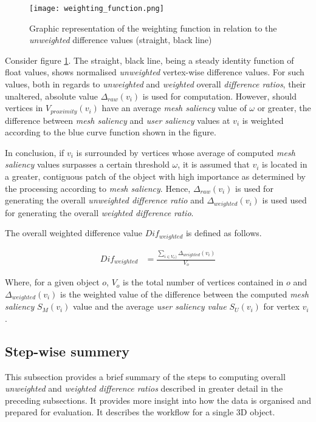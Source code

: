 \begin{figure}[htb]
  \centering
  \texttt{[image: weighting\_function.png]}\\ %
  \caption{Graphic representation of the weighting function in relation to the \textit{unweighted} difference values (straight, black line)}\label{fig:weighting_function}
\end{figure}

Consider figure \ref{fig:weighting_function}. The straight, black line, being a steady identity function of float values, shows normalised \textit{unweighted} vertex-wise difference values. For such values, both in regards to \textit{unweighted} and \textit{weighted} overall \textit{difference ratios}, their unaltered, absolute value $\Delta_{raw}(v_i)$ is used for computation. However, should vertices in $V_{proximity}(v_i)$ have an average \textit{mesh saliency} value of $\omega$ or greater, the difference between \textit{mesh saliency} and \textit{user saliency} values at $v_i$ is weighted according to the blue curve function shown in the figure.

In conclusion, if $v_i$ is surrounded by vertices whose average of computed \textit{mesh saliency} values surpasses a certain threshold $\omega$, it is assumed that $v_i$ is located in a greater, contiguous patch of the object with high importance as determined by the processing according to \textit{mesh saliency}. Hence, $\Delta_{raw}(v_i)$ is used for generating the overall \textit{unweighted difference ratio} and $\Delta_{weighted}(v_i)$ is used used for generating the overall \textit{weighted difference ratio}.

The overall weighted difference value $Dif_{weighted}$ is defined as follows.

\begin{align*}
Dif_{weighted} &= \frac
	{
		\sum_{i \in V_{o})}
			\Delta_{weighted}(v_i)
	}{
		V_{o}
	}
\end{align*}

Where, for a given object $o$, $V_{o}$ is the total number of vertices contained in $o$ and $\Delta_{weighted}(v_i)$ is the weighted value of the difference between the computed \textit{mesh saliency} $S_{M}(v_i)$ value and the average \textit{user saliency value} $S_{U}(v_i)$ for vertex $v_i$.


		\subsection{Step-wise summery}
		\label{sec:ste_wise_summery}
This subsection provides a brief summary of the steps to computing overall \textit{unweighted} and \textit{weighted difference ratios} described in greater detail in the preceding subsections. It provides more insight into how the data is organised and prepared for evaluation. It describes the workflow for a single 3D object.


